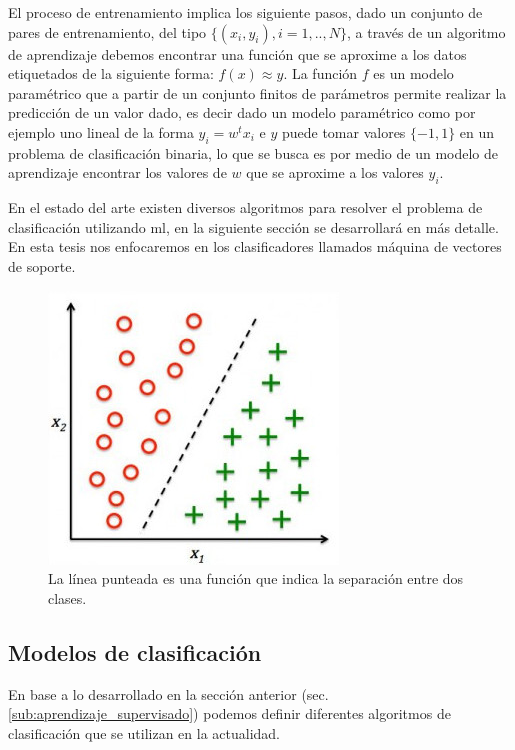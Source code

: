 El proceso de entrenamiento implica los siguiente pasos, dado un conjunto de pares de entrenamiento, del tipo $\{(x_i, y_i), i=1,..,N\}$, a través de un algoritmo de aprendizaje debemos encontrar una función que se aproxime a los datos etiquetados de la siguiente forma: $f(x) ≈ y$. La función $f$ es un modelo paramétrico que a partir de un conjunto finitos de parámetros permite realizar la predicción de un valor dado, es decir dado un modelo paramétrico como por ejemplo uno lineal de la forma $y_i = w^t x_i$ e $y$ puede tomar valores $\{-1,1\}$ en un problema de clasificación binaria, lo que se busca es por medio de un modelo de aprendizaje encontrar los valores de  $w$ que se aproxime a los valores $y_i$.

En el estado del arte existen diversos algoritmos para resolver el problema de clasificación utilizando \ac{ml}, en la siguiente sección se desarrollará en más detalle. En esta tesis nos enfocaremos en los clasificadores llamados máquina de vectores de soporte. 

\begin{figure}[H] \centering
  \includegraphics[scale=0.4,keepaspectratio=true,clip=true]{imagenes/MarcoTeorico/classification.jpg}
  \caption{La línea punteada es una función que indica la separación entre dos clases.}\label{Fig:clasificacion}
\end{figure}




\subsection{Modelos de clasificación}\label{sub:clasificadores}

En base a lo desarrollado en la sección anterior (sec.\ref{sub:aprendizaje_supervisado}) podemos definir diferentes algoritmos de clasificación que se utilizan en la actualidad.

